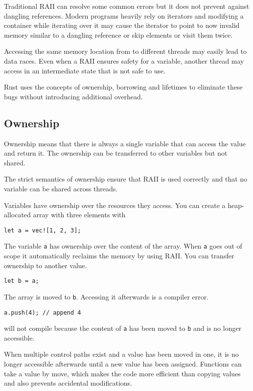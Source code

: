 \documentclass[conference,twocolumn]{IEEEtran}
\begin{document}
Traditional RAII can resolve some common errors but it does not prevent against dangling references. Modern programs heavily rely on iterators and modifying a container while iterating over it may cause the iterator to point to now invalid memory similar to a dangling reference or skip elements or visit them twice.

Accessing the same memory location from to different threads may easily lead to data races. Even when a RAII ensures safety for a variable, another thread may access in an intermediate state that is not safe to use.

Rust uses the concepts of ownership, borrowing and lifetimes to eliminate these bugs without introducing additional overhead.

\subsection{Ownership}

Ownership means that there is always a single variable that can access the value and return it. The ownership can be transferred to other variables but not shared. \cite{RustBook}

The strict semantics of ownership ensure that RAII is used correctly and that no variable can be shared across threads.

Variables have ownership over the resources they access.
You can create a heap-allocated array with three elements with
\begin{lstlisting}
let a = vec![1, 2, 3];
\end{lstlisting}
The variable \verb|a| has ownership over the content of the array. When \verb|a| goes out of scope it automatically reclaims the memory by using RAII.
You can transfer ownership to another value.
\begin{lstlisting}
let b = a;
\end{lstlisting}
The array is moved to \verb|b|. Accessing it afterwards is a compiler error.

\begin{lstlisting}
a.push(4); // append 4
\end{lstlisting}
will not compile because the content of \verb|a| has been moved to \verb|b| and is no longer accessible.

When multiple control paths exist and a value has been moved in one, it is no longer accessible afterwards until a new value has been assigned. Functions can take a value by move, which makes the code more efficient than copying values and also prevents accidental modifications.
\end{document}

